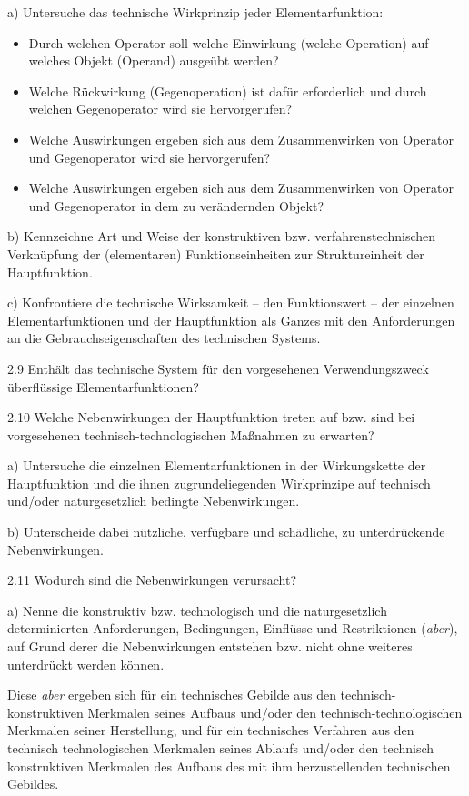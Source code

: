 \documentclass[12pt,a4paper]{article}
\begin{document}
a) Untersuche das technische Wirkprinzip jeder Elementarfunktion:
\begin{itemize}
\item Durch welchen Operator soll welche Einwirkung (welche Operation) auf
  welches Objekt (Operand) ausgeübt werden?
\item Welche Rückwirkung (Gegenoperation) ist dafür erforderlich und durch
  welchen Gegenoperator wird sie hervorgerufen?
\item Welche Auswirkungen ergeben sich aus dem Zusammenwirken von Operator und
  Gegenoperator wird sie hervorgerufen?
\item Welche Auswirkungen ergeben sich aus dem Zusammenwirken von Operator und
  Gegenoperator in dem zu verändernden Objekt?
\end{itemize}

b) Kennzeichne Art und Weise der konstruktiven bzw. verfahrenstechnischen
Verknüpfung der (elementaren) Funktionseinheiten zur Struktureinheit der
Hauptfunktion.

c) Konfrontiere die technische Wirksamkeit – den Funktionswert – der einzelnen
Elementarfunktionen und der Hauptfunktion als Ganzes mit den Anforderungen an
die Gebrauchseigenschaften des technischen Systems.

2.9 Enthält das technische System für den vorgesehenen Verwendungszweck
überflüssige Elementarfunktionen?

2.10 Welche Nebenwirkungen der Hauptfunktion treten auf bzw. sind bei
vorgesehenen technisch-technologischen Maßnahmen zu erwarten?

a) Untersuche die einzelnen Elementarfunktionen in der Wirkungskette der
Hauptfunktion und die ihnen zugrundeliegenden Wirkprinzipe auf technisch
und/oder naturgesetzlich bedingte Nebenwirkungen.

b) Unterscheide dabei nützliche, verfügbare und schädliche, zu unterdrückende
Nebenwirkungen.

2.11  Wodurch sind die Nebenwirkungen verursacht?

a) Nenne die konstruktiv bzw. technologisch und die naturgesetzlich
determinierten Anforderungen, Bedingungen, Einflüsse und Restriktionen
(\emph{aber}), auf Grund derer die Nebenwirkungen entstehen bzw. nicht ohne
weiteres unterdrückt werden können.

Diese \emph{aber} ergeben sich für ein technisches Gebilde aus den
technisch-konstruktiven Merkmalen seines Aufbaus und/oder den
technisch-technologischen Merkmalen seiner Herstellung, und für ein technisches
Verfahren aus den technisch technologischen Merkmalen seines Ablaufs und/oder
den technisch konstruktiven Merkmalen des Aufbaus des mit ihm herzustellenden
technischen Gebildes.
\end{document}
